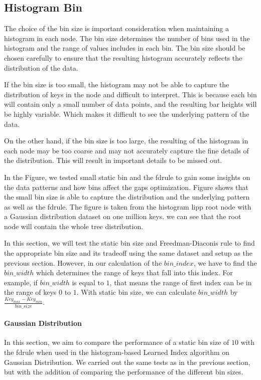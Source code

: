 \documentclass[11pt,a4paper]{article}
\newcommand{\learnindex}{\textsf{Learned Index}\xspace}
\begin{document}
\subsection{Histogram Bin} \label{Histogram Bin}
The choice of the bin size is important consideration when maintaining a histogram in each node. The bin size determines the number of bins used in the histogram and the range of values includes in each bin. The bin size should be chosen carefully to ensure that the resulting histogram accurately reflects the distribution of the data. 

If the bin size is too small, the histogram may not be able to capture the distribution of keys in the node and difficult to interpret. This is because each bin will contain only a small number of data points, and the resulting bar heights will be highly variable. Which makes it difficult to see the underlying pattern of the data.  

On the other hand, if the bin size is too large, the resulting of the histogram in each node may be too coarse and may not accurately capture the fine details of the distribution. This will result in important details to be missed out. 

In the Figure, we tested small static bin and the \acrshort{fdrule} to gain some insights on the data patterns and how bins affect the gaps optimization. Figure shows that the small bin size is able to capture the distribution and the underlying pattern as well as the \acrshort{fdrule}. The figure is taken from the histogram \acrshort{lipp} root node with a Gaussian distribution dataset on one million keys. we can see that the root node will contain the whole tree distribution. 

In this section, we will test the static bin size and Freedman-Diaconis rule to find the appropriate bin size and its tradeoff using the same dataset and setup as the previous section. However, in our calculation of the $bin\_index$, we have to find the $bin\_width$ which determines the range of keys that fall into this index. For example, if $bin\_width$ is equal to $1$,  that means the range of first index can be in the range of keys $0$ to $1$. With static bin size, we can calculate $bin\_width$ by $\frac{Key_{max} - Key_{min}}{bin\_size}$.

\paragraph{Gaussian Distribution} In this section, we aim to compare the performance of a static bin size of $10$ with the \acrshort{fdrule} when used in the histogram-based \learnindex algorithm on Gaussian Distribution. We carried out the same tests as in the previous section, but with the addition of comparing the performance of the different bin sizes.
\end{document}
